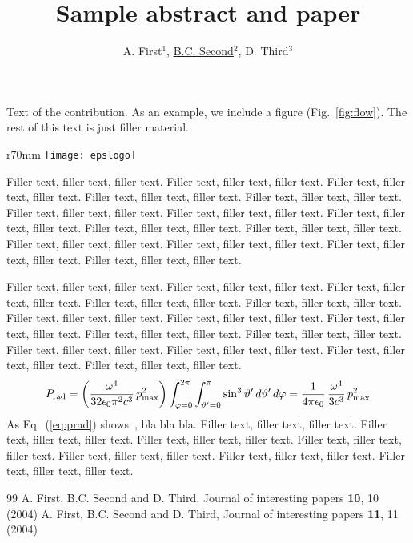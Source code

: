 \documentclass{epsconf}
\title{Sample abstract and paper}
\author{A. First$^1$, \underline{B.C. Second}$^2$, D. Third$^3$}
\institute{$^1$ Institute, City, Country\\
$^2$ Institute, City, Country\\
$^3$ Institute, City, Country}
\begin{document}
\maketitle

Text of the contribution. As an example, we include a figure (Fig.~\ref{fig:flow}). The rest of
this text is just filler material.

\begin{wrapfigure}{r}{70mm}\centering
\vspace{0cm} %
\texttt{[image: epslogo]}
\caption{\it \small EPS logo}
\label{fig:flow}
\vspace{0cm} %
\end{wrapfigure}
Filler text, filler text, filler text.
Filler text, filler text, filler text.
Filler text, filler text, filler text.
Filler text, filler text, filler text.
Filler text, filler text, filler text.
Filler text, filler text, filler text.
Filler text, filler text, filler text.
Filler text, filler text, filler text.
Filler text, filler text, filler text.
Filler text, filler text, filler text.
Filler text, filler text, filler text.
Filler text, filler text, filler text.
Filler text, filler text, filler text.
Filler text, filler text, filler text.

Filler text, filler text, filler text.
Filler text, filler text, filler text.
Filler text, filler text, filler text.
Filler text, filler text, filler text.
Filler text, filler text, filler text.
Filler text, filler text, filler text.
Filler text, filler text, filler text.
Filler text, filler text, filler text.
Filler text, filler text, filler text.
Filler text, filler text, filler text.
Filler text, filler text, filler text.
Filler text, filler text, filler text.
Filler text, filler text, filler text.
Filler text, filler text, filler text.
\begin{equation}
\label{eq:prad}
    P_{\text{\scriptsize rad}} =
    \left( \frac{\omega^4}{32 \epsilon_0 \pi^2 c^3}\,p_{\text{\scriptsize max}}^2 \right)
    \int_{\varphi=0}^{2\pi} \int_{\vartheta'=0}^{\pi} \sin^3\vartheta'\,d\vartheta'\,d\varphi
    = \frac{1}{4\pi\epsilon_0}\,\frac{\omega^4}{3 c^3}\,p_{\text{\scriptsize max}}^2
\end{equation}
As Eq.~(\ref{eq:prad}) shows~\cite{Interestingpaper}, bla bla bla.
Filler text, filler text, filler text.
Filler text, filler text, filler text.
Filler text, filler text, filler text.
Filler text, filler text, filler text.
Filler text, filler text, filler text.
Filler text, filler text, filler text.
Filler text, filler text, filler text.

\begin{thebibliography}{99}
A. First, B.C. Second and D. Third, Journal of interesting papers {\bf 10}, 10 (2004)
A. First, B.C. Second and D. Third, Journal of interesting papers {\bf 11}, 11 (2004)
\end{thebibliography}
\end{document}
